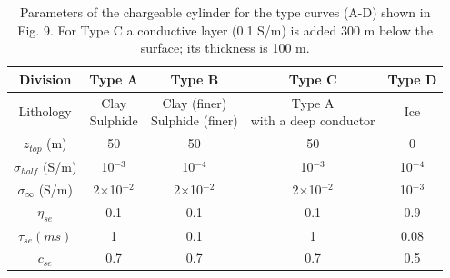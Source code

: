 \documentclass[manuscript]{geophysics}
\newcommand{\siginf}{\sigma_\infty}
\begin{document}
\begin{table}
 \centering
 \caption{Parameters of the chargeable cylinder for the type curves (A-D) shown in Fig. 9. For Type C a conductive layer (0.1 S/m) is added 300 m below the surface; its thickness is 100 m.}
 \vspace{0.5cm}
 \begin{tabular}{@{}|c|c|c|c|c|}
    \hline
    Division    &Type A &Type B &Type C & Type D\\
    \hline
    Lithology    &\makecell{Clay \\ Sulphide} & \makecell{Clay (finer) \\ Sulphide (finer)} & \makecell{Type A \\ with a deep conductor} & Ice \\
    $z_{top}$ (m)                 &50 &50 &50 & 0\\
    $\sigma_{half}$ (S/m)   &10$^{-3}$ &10$^{-4}$ &10$^{-3}$ & 10$^{-4}$\\
    $\siginf$ (S/m)         &2$\times$10$^{-2}$ &2$\times$10$^{-2}$ &2$\times$10$^{-2}$ & 10$^{-3}$\\
    $\eta_{se}$             &0.1 &0.1 &0.1 & 0.9\\
    $\tau_{se} (ms)$        &1 &0.1 &1 & 0.08\\
    $c_{se}$                &0.7 &0.7 &0.7 & 0.5 \\
    \hline
 \end{tabular}
 \label{table: 2}
\end{table}
\clearpage
\end{document}
